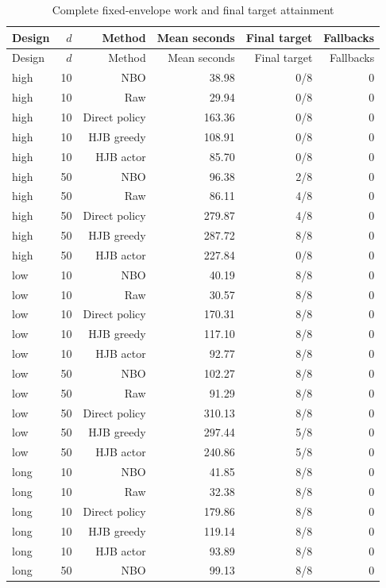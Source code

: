 \begingroup\small
\begin{longtable}{lrrrrr}
\caption{Complete fixed-envelope work and final target attainment}\label{tab:r16-robustness-work}\\
\toprule
Design & $d$ & Method & Mean seconds & Final target & Fallbacks \\
\midrule
\endfirsthead
\toprule
Design & $d$ & Method & Mean seconds & Final target & Fallbacks \\
\midrule
\endhead
high & 10 & NBO & 38.98 & 0/8 & 0 \\
high & 10 & Raw & 29.94 & 0/8 & 0 \\
high & 10 & Direct policy & 163.36 & 0/8 & 0 \\
high & 10 & HJB greedy & 108.91 & 0/8 & 0 \\
high & 10 & HJB actor & 85.70 & 0/8 & 0 \\
high & 50 & NBO & 96.38 & 2/8 & 0 \\
high & 50 & Raw & 86.11 & 4/8 & 0 \\
high & 50 & Direct policy & 279.87 & 4/8 & 0 \\
high & 50 & HJB greedy & 287.72 & 8/8 & 0 \\
high & 50 & HJB actor & 227.84 & 0/8 & 0 \\
low & 10 & NBO & 40.19 & 8/8 & 0 \\
low & 10 & Raw & 30.57 & 8/8 & 0 \\
low & 10 & Direct policy & 170.31 & 8/8 & 0 \\
low & 10 & HJB greedy & 117.10 & 8/8 & 0 \\
low & 10 & HJB actor & 92.77 & 8/8 & 0 \\
low & 50 & NBO & 102.27 & 8/8 & 0 \\
low & 50 & Raw & 91.29 & 8/8 & 0 \\
low & 50 & Direct policy & 310.13 & 8/8 & 0 \\
low & 50 & HJB greedy & 297.44 & 5/8 & 0 \\
low & 50 & HJB actor & 240.86 & 5/8 & 0 \\
long & 10 & NBO & 41.85 & 8/8 & 0 \\
long & 10 & Raw & 32.38 & 8/8 & 0 \\
long & 10 & Direct policy & 179.86 & 8/8 & 0 \\
long & 10 & HJB greedy & 119.14 & 8/8 & 0 \\
long & 10 & HJB actor & 93.89 & 8/8 & 0 \\
long & 50 & NBO & 99.13 & 8/8 & 0 \\

\end{longtable}
